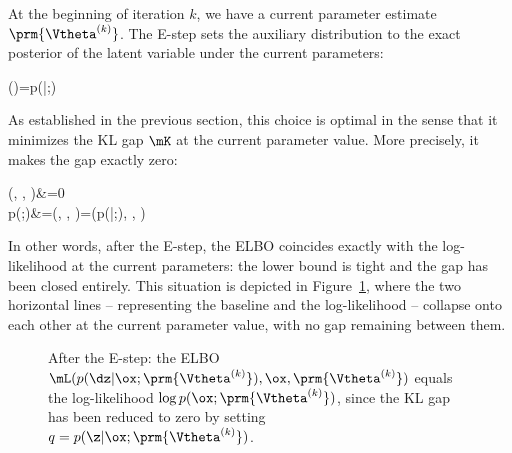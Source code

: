 At the beginning of iteration $k$, we have a current parameter estimate $\prm{\Vtheta^{(k)}}$. The E-step sets the auxiliary distribution to the exact posterior of the latent variable under the current parameters:
\begin{myequation}
(\z)=p(\z|\ox ;)
\end{myequation}
As established in the previous section, this choice is optimal in the sense that it minimizes the KL gap $\mK$ at the current parameter value. More precisely, it makes the gap exactly zero:
\begin{myalign}
 \mK(, \ox, )&=0\\
\log p(\ox;)&=\mL(, \ox, )=\mL(p(\dz|\ox ;), \ox, )
\end{myalign}
In other words, after the E-step, the ELBO coincides exactly with the log-likelihood at the current parameters: the lower bound is tight and the gap has been closed entirely. This situation is depicted in Figure~\ref{fig2}, where the two horizontal lines -- representing the baseline and the log-likelihood -- collapse onto each other at the current parameter value, with no gap remaining between them.

\begin{figure}[ht]
\begin{center}
\caption{After the E-step: the ELBO $\mL(p(\dz|\ox;\prm{\Vtheta^{(k)}}),\ox,\prm{\Vtheta^{(k)}})$ equals the log-likelihood $\log p(\ox;\prm{\Vtheta^{(k)}})$, since the KL gap has been reduced to zero by setting $q = p(\z|\ox;\prm{\Vtheta^{(k)}})$.}\label{fig2}
\end{center}
\end{figure}


